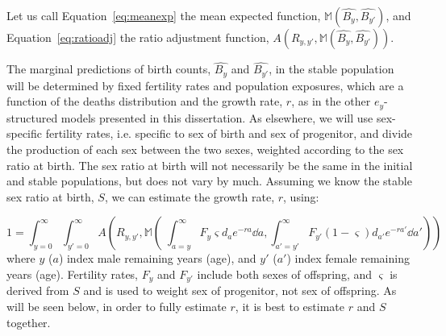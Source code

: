 Let us call Equation~\eqref{eq:meanexp} the mean
expected function, $\mathbb{M}(\widehat{B_y}, \widehat{B_{y'}})$, and
Equation~\eqref{eq:ratioadj} the ratio adjustment function, 
$A(R_{y,y'},\mathbb{M}(\widehat{B_y}, \widehat{B_{y'}}))$.

The marginal predictions of birth counts, $\widehat{B_y}$ and
$\widehat{B_{y'}}$, in the stable population will be determined by
fixed fertility rates and population exposures, which are a function of the
deaths distribution and the growth rate, $r$, as in the other $e_y$-structured 
models presented in this dissertation. As elsewhere, we will use sex-specific
fertility rates, i.e. specific to sex of birth and sex of progenitor, and divide
the production of each sex between the two sexes, weighted according to the sex
ratio at birth. The sex ratio at birth will not necessarily be the same in the
initial and stable populations, but does not vary by much. Assuming we know the
stable sex ratio at birth, $S$, we can estimate the growth rate, $r$, using:

\begin{equation}
\label{eq:ex2sexCRunity}
1 = \int_{y=0}^\infty \int_{y'=0}^\infty
A\left(R_{y,y'},\mathbb{M}\left(\;\int_{a=y}^\infty F_y \varsigma d_a
e^{-ra} \dd a, \int _{a'=y'}^\infty F_{y'} (1-\varsigma) d_{a'} e^{-ra'} \dd
a'\right)\right)
\end{equation} 
where $y$ ($a$) index male remaining years (age), and $y'$ ($a'$) index female
remaining years (age). Fertility rates, $F_y$ and $F_{y'}$ include both sexes of
offspring, and $\varsigma$ is derived from $S$ and is used to weight sex of
progenitor, not sex of offspring. As will be seen below, in order to fully estimate $r$, it is best
to estimate $r$ and $S$ together.

















